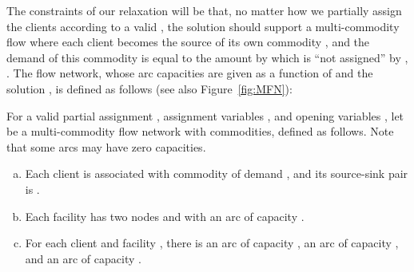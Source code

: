 The constraints of our relaxation will be that, no matter how we partially assign the clients according to a valid
, the solution  should support a multi-commodity flow where each client  becomes the source of its own commodity , and the demand of this commodity is equal to the amount by which  is ``not assigned'' by , . The flow network, whose arc capacities are given as a function of  and the solution , is defined as follows (see also Figure~\ref{fig:MFN}):
\begin{definition}
\label{def:mfn}
For a valid partial assignment ,  assignment variables , and opening variables , let  be a
multi-commodity flow network with  commodities, defined as follows. Note that some arcs may have zero capacities.
\begin{enumerate}[(a)]
\item Each client  is associated with commodity  of demand , and its source-sink pair is .  \item Each facility  has two nodes  and  with an arc  of capacity .  \item For each client  and facility , there is an arc  of capacity , an arc
   of capacity , and an arc  of capacity .
\end{enumerate}
\end{definition}


